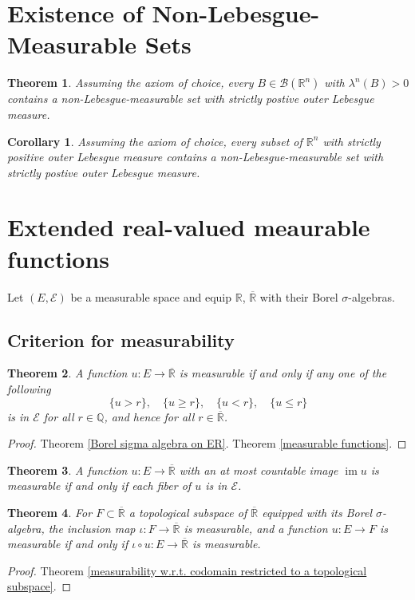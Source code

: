 \documentclass[11pt, a4paper, openany]{book}
\newtheorem{thm}{Theorem}\newtheorem{lem}{Lemma}\newtheorem{crl}{Corollary}
\theoremstyle{definition}
\DeclareMathOperator{\im}{im}
\newcommand{\er}{\overline{\mathbb{R}}}
\begin{document}
\section{Existence of Non-Lebesgue-Measurable Sets}
    \begin{thm}
        Assuming the axiom of choice, every $B\in\mathscr{B}(\mathbb{R}^n)$ with $\lambda^n(B)>0$ contains a non-Lebesgue-measurable set with strictly postive outer Lebesgue measure.
    \end{thm}
    \begin{crl}
        Assuming the axiom of choice, every subset of $\mathbb{R}^n$ with strictly positive outer Lebesgue measure contains a non-Lebesgue-measurable set with strictly postive outer Lebesgue measure.
    \end{crl}
\section{Extended real-valued meaurable functions}
    Let $(E,\mathscr{E})$ be a measurable space and equip $\mathbb{R}$, $\er$ with their Borel $\sigma$-algebras. %
\subsection{Criterion for measurability}
    \begin{thm}\label{criterion for measurability}
        A function $u:E\rightarrow \er$ is measurable if and only if any one of the following
        \[
            \{u>r\},\quad \{u\geqslant r\},\quad \{u<r\},\quad \{u\leqslant r\}
        \]
        is in $\mathscr{E}$ for all $r\in\mathbb{Q}$, and hence for all $r\in\er$.
    \end{thm}
    \begin{proof}
        Theorem \ref{Borel sigma algebra on ER}. Theorem \ref{measurable functions}.
    \end{proof}
    \begin{thm}\label{measurability for countable image}
        A function $u:E\rightarrow \er$ with an at most countable image $\im u$ is measurable if and only if each fiber of $u$ is in $\mathscr{E}$.
    \end{thm}
    \begin{thm}\label{criterion for measurability for subsets of the extended real line}
        For $F\subset \er$ a topological subspace of $\er$ equipped with its Borel $\sigma$-algebra, the inclusion map $\iota:F\rightarrow \er$ is measurable, and a function $u:E\rightarrow F$ is measurable if and only if $\iota\circ u:E\rightarrow \er$ is measurable.
    \end{thm}
    \begin{proof}
        Theorem \ref{measurability w.r.t. codomain restricted to a topological subspace}.
    \end{proof}
\end{document}
